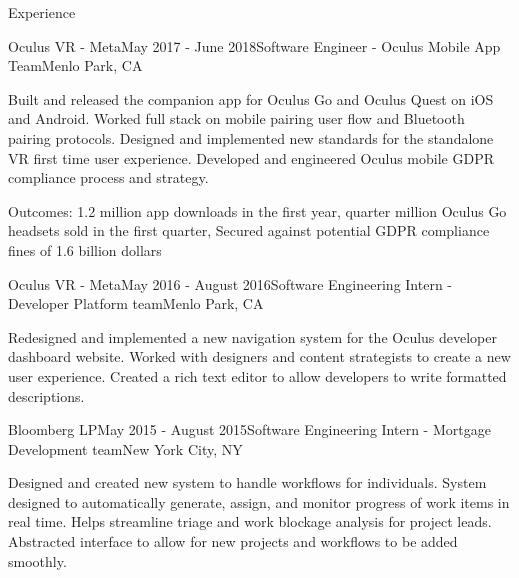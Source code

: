 \documentclass{resume} %
\begin{document}

\begin{rSection}{Experience}




  \begin{rSubsection}{Oculus VR - Meta}{May 2017 - June 2018}{Software Engineer - Oculus Mobile App Team}{Menlo Park, CA}
  \item Built and released the companion app for Oculus Go and Oculus
      Quest on iOS and Android.
      Worked full stack on mobile pairing user flow and Bluetooth pairing protocols.
      Designed and implemented new standards for the standalone VR first time user experience. 
      Developed and engineered Oculus mobile GDPR compliance process and strategy.
  \item Outcomes: 1.2 million app downloads in the first year, quarter million Oculus Go headsets sold in the first quarter, 
      Secured against potential GDPR compliance fines of 1.6 billion dollars 
  \end{rSubsection}


  \begin{rSubsection}{Oculus VR - Meta}{May 2016 - August 2016}{Software Engineering Intern - Developer Platform team}{Menlo Park, CA}
  \item Redesigned and implemented a new navigation system for the Oculus
      developer dashboard website. Worked with designers and content strategists
      to create a new user experience. Created a rich text editor to allow
      developers to write formatted descriptions. 
  \end{rSubsection}



  \begin{rSubsection}{Bloomberg LP}{May 2015 - August 2015}{Software Engineering Intern - Mortgage Development team}{New York City, NY}
  \item Designed and created new system to handle workflows for individuals.
      System designed to automatically generate, assign, and monitor progress of
      work items in real time. Helps streamline triage and work blockage
      analysis for project leads. Abstracted interface to allow for new projects
      and workflows to be added smoothly. 
\end{rSubsection}


\end{rSection}
\end{document}
